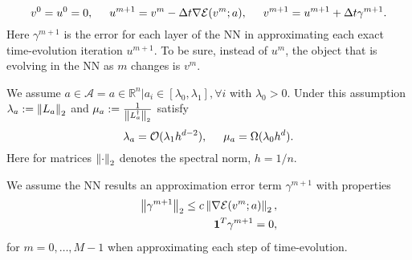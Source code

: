 \begin{equation}
\label{eq:iterationschema_noisy_steepest_decent}
v^0 = u^0 = 0,\hspace*{.5cm} u^{m+1} = v^m - \Delta t \nabla \mathcal{E}(v^m;a),\hspace*{.5cm} v^{m+1} = u^{m+1} + \Delta t \gamma^{m+1}.
\end{equation}
Here $\gamma^{m+1}$ is the error for each layer of the NN in approximating each exact time-evolution iteration $u^{m+1}$. To be sure, instead of $u^{m}$, the object that is evolving in the NN as $m$ changes is $v^m$.
\begin{assumption}
	We assume $a\in \mathscr{A} = {a\in \mathbb{R}^n \vert a_i \in [\lambda_{0}, \lambda_{1}], \forall i }$ with $\lambda_{0} > 0$. Under this assumption $\lambda_{a} := \left\lVert L_a\right\rVert_{2}$ and $\mu_a := \frac{1}{\left\lVert L_{a}^{\dag}\right\rVert_2}$ satisfy
	\begin{equation}
	\label{ass:lambda_a_properties}
	\lambda_{a} = \mathcal{O}(\lambda_{1} h^{d-2}), \hspace*{.5cm} \mu_a = \Omega(\lambda_{0} h^d).
	\end{equation}
	Here for matrices $\left\lVert\cdot\right\rVert_{2}$ denotes the spectral norm, $h=1/n$. 
\end{assumption}
\begin{assumption}
	We assume the NN results an approximation error term $\gamma^{m+1}$ with properties
	\begin{eqnarray}
	\label{ass:ass2}
	\left\lVert\gamma^{m+1}\right\rVert_{2} \leq c \left\lVert\nabla \mathcal{E}(v^m;a)\right\rVert_{2}, \\
	\textbf{1}^T \gamma^{m+1} = 0, 
	\end{eqnarray}
	for $m=0,\dots ,M-1$ when approximating each step of time-evolution.
\end{assumption}
